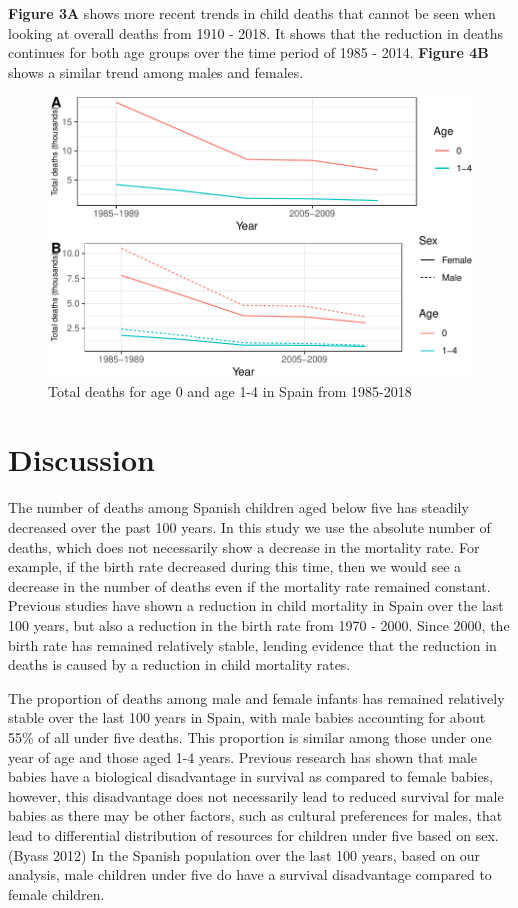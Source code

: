\documentclass[]{article}
\begin{document}
\textbf{Figure 3A} shows more recent trends in child deaths that cannot
be seen when looking at overall deaths from 1910 - 2018. It shows that
the reduction in deaths continues for both age groups over the time
period of 1985 - 2014. \textbf{Figure 4B} shows a similar trend among
males and females.

\begin{figure}
\centering
\includegraphics{dcoomes_hw_10_files/figure-latex/recent-1.pdf}
\caption{Total deaths for age 0 and age 1-4 in Spain from 1985-2018}
\end{figure}

\section{Discussion}\label{discussion}

The number of deaths among Spanish children aged below five has steadily
decreased over the past 100 years. In this study we use the absolute
number of deaths, which does not necessarily show a decrease in the
mortality rate. For example, if the birth rate decreased during this
time, then we would see a decrease in the number of deaths even if the
mortality rate remained constant. Previous studies have shown a
reduction in child mortality in Spain over the last 100 years, but also
a reduction in the birth rate from 1970 - 2000. Since 2000, the birth
rate has remained relatively stable, lending evidence that the reduction
in deaths is caused by a reduction in child mortality rates.

The proportion of deaths among male and female infants has remained
relatively stable over the last 100 years in Spain, with male babies
accounting for about 55\% of all under five deaths. This proportion is
similar among those under one year of age and those aged 1-4 years.
Previous research has shown that male babies have a biological
disadvantage in survival as compared to female babies, however, this
disadvantage does not necessarily lead to reduced survival for male
babies as there may be other factors, such as cultural preferences for
males, that lead to differential distribution of resources for children
under five based on sex.(Byass 2012) In the Spanish population over the
last 100 years, based on our analysis, male children under five do have
a survival disadvantage compared to female children.
\end{document}

